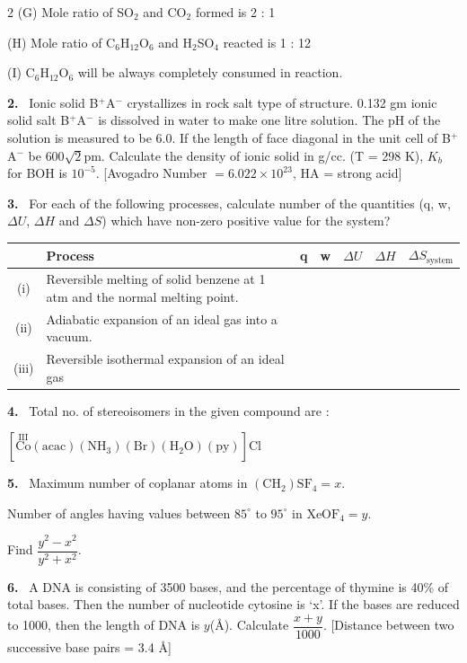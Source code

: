 \documentclass[10pt]{extarticle}
\newcommand{\qn}[1]{\par\smallskip\noindent\textbf{#1.}~}
\begin{document}
\begin{multicols}{2}
(G) Mole ratio of SO$_2$ and CO$_2$ formed is 2 : 1

(H) Mole ratio of C$_6$H$_{12}$O$_6$ and H$_2$SO$_4$ reacted is 1 : 12

(I) C$_6$H$_{12}$O$_6$ will be always completely consumed in reaction.

\qn{2} Ionic solid B$^+$A$^-$ crystallizes in rock salt type of structure. 0.132 gm ionic solid salt B$^+$A$^-$ is dissolved in water to make one litre solution. The pH of the solution is measured to be 6.0. If the length of face diagonal in the unit cell of B$^+$A$^-$ be $600\sqrt2$pm. Calculate the density of ionic solid in g/cc. (T = 298 K), $K_b$ for BOH is $10^{-5}$. [Avogadro Number $=6.022\times10^{23}$, HA = strong acid]

\qn{3} For each of the following processes, calculate number of the quantities (q, w, $\Delta U$, $\Delta H$ and $\Delta S$) which have non-zero positive value for the system?
\par\nobreak
\begin{center}\footnotesize
\begin{tabular}{|c|p{2.6cm}|p{0.5cm}|p{0.5cm}|p{0.7cm}|p{0.7cm}|p{1.2cm}|}
\hline
 & \centering Process & \centering q & \centering w & \centering $\Delta U$ & \centering $\Delta H$ & \centering\arraybackslash $\Delta S_{\text{system}}$\\ \hline
(i) & Reversible melting of solid benzene at 1 atm and the normal melting point. & & & & & \\ \hline
(ii) & Adiabatic expansion of an ideal gas into a vacuum. & & & & & \\ \hline
(iii) & Reversible isothermal expansion of an ideal gas & & & & & \\ \hline
\end{tabular}
\end{center}

\qn{4} Total no. of stereoisomers in the given compound are :

$\mathrm{[\overset{III}{Co}(acac)(NH_3)(Br)(H_2O)(py)]Cl}$

\qn{5} Maximum number of coplanar atoms in $\mathrm{(CH_2)SF_4}=x$.

Number of angles having values between $85^\circ$ to $95^\circ$ in $\mathrm{XeOF_4}=y$.

Find $\dfrac{y^2-x^2}{y^2+x^2}$.

\qn{6} A DNA is consisting of 3500 bases, and the percentage of thymine is 40\% of total bases. Then the number of nucleotide cytosine is `x'. If the bases are reduced to 1000, then the length of DNA is $y$(\AA). Calculate $\dfrac{x+y}{1000}$. [Distance between two successive base pairs = 3.4 \AA]


\end{multicols}
\end{document}
